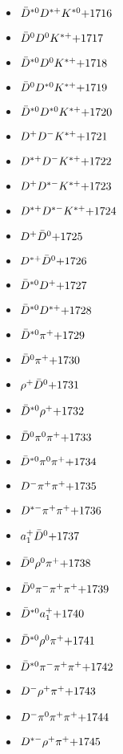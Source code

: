 \begin{multicols}{3}
\begin{itemize}
 \item $ \bar{D}^{*0} D^{*+} K^{*0} \hfill{+1716}$
 \item $ \bar{D}^{0} D^{0} K^{*+} \hfill{+1717}$
 \item $ \bar{D}^{*0} D^{0} K^{*+} \hfill{+1718}$
 \item $ \bar{D}^{0} D^{*0} K^{*+} \hfill{+1719}$
 \item $ \bar{D}^{*0} D^{*0} K^{*+} \hfill{+1720}$
 \item $ D^{+} D^{-} K^{*+} \hfill{+1721}$
 \item $ D^{*+} D^{-} K^{*+} \hfill{+1722}$
 \item $ D^{+} D^{*-} K^{*+} \hfill{+1723}$
 \item $ D^{*+} D^{*-} K^{*+} \hfill{+1724}$
 \item $ D^{+} \bar{D}^{0} \hfill{+1725}$
 \item $ D^{*+} \bar{D}^{0} \hfill{+1726}$
 \item $ \bar{D}^{*0} D^{+} \hfill{+1727}$
 \item $ \bar{D}^{*0} D^{*+} \hfill{+1728}$
 \item $ \bar{D}^{*0} \pi^{+} \hfill{+1729}$
 \item $ \bar{D}^{0} \pi^{+} \hfill{+1730}$
 \item $ \rho^{+} \bar{D}^{0} \hfill{+1731}$
 \item $ \bar{D}^{*0} \rho^{+} \hfill{+1732}$
 \item $ \bar{D}^{0} \pi^{0} \pi^{+} \hfill{+1733}$
 \item $ \bar{D}^{*0} \pi^{0} \pi^{+} \hfill{+1734}$
 \item $ D^{-} \pi^{+} \pi^{+} \hfill{+1735}$
 \item $ D^{*-} \pi^{+} \pi^{+} \hfill{+1736}$
 \item $ a_{1}^{+} \bar{D}^{0} \hfill{+1737}$
 \item $ \bar{D}^{0} \rho^{0} \pi^{+} \hfill{+1738}$
 \item $ \bar{D}^{0} \pi^{-} \pi^{+} \pi^{+} \hfill{+1739}$
 \item $ \bar{D}^{*0} a_{1}^{+} \hfill{+1740}$
 \item $ \bar{D}^{*0} \rho^{0} \pi^{+} \hfill{+1741}$
 \item $ \bar{D}^{*0} \pi^{-} \pi^{+} \pi^{+} \hfill{+1742}$
 \item $ D^{-} \rho^{+} \pi^{+} \hfill{+1743}$
 \item $ D^{-} \pi^{0} \pi^{+} \pi^{+} \hfill{+1744}$
 \item $ D^{*-} \rho^{+} \pi^{+} \hfill{+1745}$

\end{itemize}
\end{multicols}
